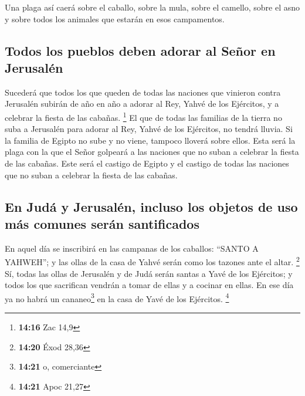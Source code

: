  Una plaga así caerá sobre el caballo, sobre la mula,
sobre el camello, sobre el asno y sobre todos los animales que estarán
en esos campamentos.

\hypertarget{todos-los-pueblos-deben-adorar-al-seuxf1or-en-jerusaluxe9n}{%
\subsection{Todos los pueblos deben adorar al Señor en
Jerusalén}\label{todos-los-pueblos-deben-adorar-al-seuxf1or-en-jerusaluxe9n}}

 Sucederá que todos los que queden de todas las naciones
que vinieron contra Jerusalén subirán de año en año a adorar al Rey,
Yahvé de los Ejércitos, y a celebrar la fiesta de las cabañas.
\footnote{\textbf{14:16} Zac 14,9}  El que de todas las
familias de la tierra no suba a Jerusalén para adorar al Rey, Yahvé de
los Ejércitos, no tendrá lluvia.  Si la familia de Egipto
no sube y no viene, tampoco lloverá sobre ellos. Esta será la plaga con
la que el Señor golpeará a las naciones que no suban a celebrar la
fiesta de las cabañas.  Este será el castigo de Egipto y
el castigo de todas las naciones que no suban a celebrar la fiesta de
las cabañas.

\hypertarget{en-juduxe1-y-jerusaluxe9n-incluso-los-objetos-de-uso-muxe1s-comunes-seruxe1n-santificados}{%
\subsection{En Judá y Jerusalén, incluso los objetos de uso más comunes
serán
santificados}\label{en-juduxe1-y-jerusaluxe9n-incluso-los-objetos-de-uso-muxe1s-comunes-seruxe1n-santificados}}

 En aquel día se inscribirá en las campanas de los
caballos: ``SANTO A YAHWEH''; y las ollas de la casa de Yahvé serán como
los tazones ante el altar. \footnote{\textbf{14:20} Éxod 28,36}
 Sí, todas las ollas de Jerusalén y de Judá serán santas
a Yavé de los Ejércitos; y todos los que sacrifican vendrán a tomar de
ellas y a cocinar en ellas. En ese día ya no habrá un cananeo\footnote{\textbf{14:21}
  o, comerciante} en la casa de Yavé de los Ejércitos. \footnote{\textbf{14:21}
  Apoc 21,27}
